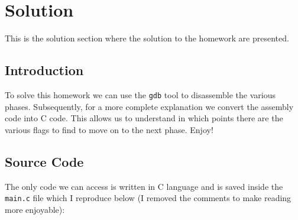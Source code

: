 \documentclass[a4paper,12pt]{report}  %
\newcommand{\lstinlinebg}[1]{\colorbox{backcolour}{\lstinline|#1|}}
\begin{document}
\newpage  %

\chapter{Solution}
This is the solution section where the solution to the homework are presented.

\section{Introduction}
To solve this homework we can use the \lstinlinebg{gdb} tool to disassemble the various phases.
Subsequently, for a more complete explanation we convert the assembly code into C code.
This allows us to understand in which points there are the various flags to find to move on to the next phase.
Enjoy!

\section{Source Code}
The only code we can access is written in C language and is saved inside the \lstinlinebg{main.c} file which I reproduce below (I removed the comments to make reading more enjoyable):
\end{document}
